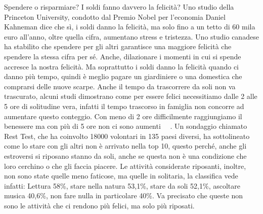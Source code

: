 \documentclass[12pt]{book} %
\begin{document}
\begin{mdframed}[linewidth=1pt]
Spendere o risparmiare? I soldi fanno davvero la felicità? Uno studio della Princeton University, condotto dal Premio
Nobel per l'economia Daniel Kahneman dice che sì, i soldi danno la felicità, ma solo fino a un tetto di 60 mila euro
all'anno, oltre quella cifra, aumentano stress e tristezza. Uno studio canadese ha stabilito che spendere per gli altri
garantisce una maggiore felicità che spendere la stessa cifra per sé. Anche, dilazionare i momenti in cui si spende
accresce la nostra felicità. Ma soprattutto i soldi danno la felicità quando ci danno più tempo, quindi è meglio pagare
un giardiniere o una domestica che comprarsi delle nuove scarpe. Anche il tempo da trascorrere da soli non va
trascurato, alcuni studi dimostrano come per essere felici necessitiamo dalle 2 alle 5 ore di solitudine vera, infatti
il tempo trascorso in famiglia non concorre ad aumentare questo conteggio. Con meno di 2 ore difficilmente raggiungiamo
il benessere ma con più di 5 ore non ci sono aumenti
\ \ .
Un sondaggio chiamato Rest Test, che ha coinvolto 18000 volontari in 135 paesi diversi, ha sottolineato come lo stare con gli altri non è arrivato nella top 10, questo perché, anche gli estroversi si riposano stanno da soli, anche se questa non è una condizione che loro cerchino o che gli faccia piacere. Le attività considerate riposanti, inoltre, non sono state quelle meno faticose, ma quelle in solitaria, la classifica vede infatti: Lettura 58\%, stare nella natura 53,1\%, stare da soli 52,1\%, ascoltare musica 40,6\%, non fare nulla in particolare 40\%. Va precisato che queste non sono le attività che ci rendono più felici, ma solo più riposati.

\bigskip


\end{mdframed}
\end{document}
